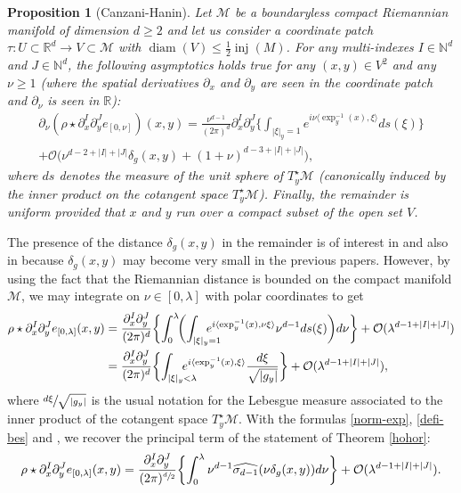 \documentclass[10pt]{amsart}
\theoremstyle{theorem}
\newtheorem{prop}[theo]{Proposition}
\theoremstyle{definition}
\newcommand\R{\mathbb{R}}
\newcommand\N{\mathbb{N}}
\begin{document}
\begin{prop}[Canzani-Hanin]\label{can-han} Let $\mathcal{M}$ be a boundaryless compact Riemannian manifold of dimension $d\geq 2$ and let us consider a coordinate patch $\tau:U\subset\R^d\to V\subset\mathcal{M}$ with $\operatorname{diam}(V)\leq \frac{1}{2}\operatorname{inj}(M)$.
For any multi-indexes $I\in \N^{d}$ and $J\in \N^d$, the following asymptotics holds true for any $(x,y)\in V^2$ and any $\nu\geq 1$ (where the spatial derivatives $\partial_x$ and $\partial_y$ are seen in the coordinate patch and $\partial_\nu$ is seen in $\R$):
\begin{multline*}
\partial_\nu (\rho \star \partial_x^I \partial_y^J e_{[0,\nu]})(x,y)=\frac{\nu^{d-1}}{(2\pi)^d} \partial_x^{I} \partial_y^{J} \biggl\{\int_{|\xi|_{y}=1} e^{i \nu\langle \exp_y^{-1}(x),\xi\rangle }ds(\xi)\biggr\}\\
+\mathcal{O}\bigl(\nu^{d-2+|I|+|J|}\delta_g(x,y)+(1+\nu)^{d-3+|I|+|J|} \bigr),
\end{multline*}
where $ds$ denotes the measure of the unit sphere of
$T_y^\star \mathcal{M}$ (canonically induced by the inner product on the cotangent space $T_y^\star\mathcal{M}$). Finally, the remainder is uniform provided that $x$ and $y$ run over a compact subset of the open set $V$.
\end{prop}
The presence of the distance $\delta_g(x,y)$ in the remainder is of interest in \cite{canzani2017c} and also in \cite[Prop.\,10]{canzani2015scaling} because $\delta_g(x,y)$ may become very small in the previous papers. However, by using the fact that the Riemannian distance is bounded on the compact manifold $\mathcal{M}$, we may integrate on $\nu\in [0,\lambda]$ with polar coordinates to get
\begin{align*}
\rho\star \partial_x^I \partial_y^J e_{[0,\lambda]}(x,y)&=\frac{\partial_x^I \partial_y^J}{(2\pi)^d}\biggl\{ \int_{0}^\lambda\! \biggl(\int_{|\xi|_{y}=1}\hspace*{-5mm} e^{i\langle \exp_y^{-1}(x),\nu \xi\rangle} \nu^{d-1} ds(\xi)\biggr) d\nu \biggr\}+\mathcal{O}(\lambda^{d-1+|I|+|J|}) \\
&=\frac{\partial_x^I \partial_y^J}{(2\pi)^d}\biggl\{ \int_{|\xi|_{y}<\lambda}\hspace*{-5mm} e^{i\langle \exp_y^{-1}(x),\xi\rangle} \frac{ d\xi }{\sqrt{|g_y|}} \biggr\}+\mathcal{O}(\lambda^{d-1+|I|+|J|}),
\end{align*}
where $\sfrac{d\xi}{\sqrt{|g_y|}}$ is the usual notation for the Lebesgue measure associated to the inner product of the cotangent space $T_y^\star \mathcal{M}$. With the formulas \eqref{norm-exp}, \eqref{defi-bes} and \cite[lines (8--9)]{canzani2017c}, we recover the principal term of the statement of Theorem \ref{hohor}:
\begin{equation*}
\rho\star \partial_x^I \partial_y^J e_{[0,\lambda]}(x,y)
= \frac{\partial_x^{I}\partial_y^J}{(2\pi)^{\sfrac{d}{2}}}\biggl\{\int_{0}^{\lambda }\nu^{d-1} \widehat{\sigma_{d-1}}(\nu \delta_g(x,y))
d\nu\biggr\} +\mathcal{O}(\lambda^{d-1+|I|+|J|}).
\end{equation*}
\end{document}
